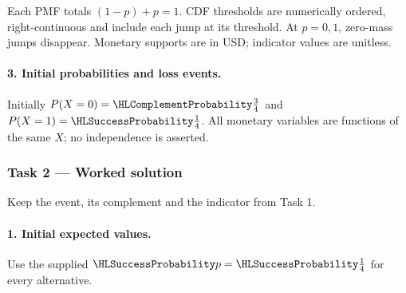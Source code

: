 Each PMF totals $(1-p)+p=1$. CDF thresholds are numerically ordered,
right-continuous and include each jump at its threshold. At $p=0,1$, zero-mass jumps disappear.
Monetary supports are in USD; indicator values are unitless.
\paragraph{3. Initial probabilities and loss events.}
Initially $P(X=0)=\FailureProb{\frac{3}{4}}$ and $P(X=1)=\SuccessProb{\frac{1}{4}}$.
All monetary variables are functions of the same $X$; no independence is asserted.
\clearpage\subsubsection*{Task 2 --- Worked solution}\label{sol:c3-energy-decision}
Keep the event, its complement and the indicator from Task 1.
\paragraph{1. Initial expected values.}
Use the supplied $\SuccessProb{p}=\SuccessProb{\frac{1}{4}}$ for every alternative.
